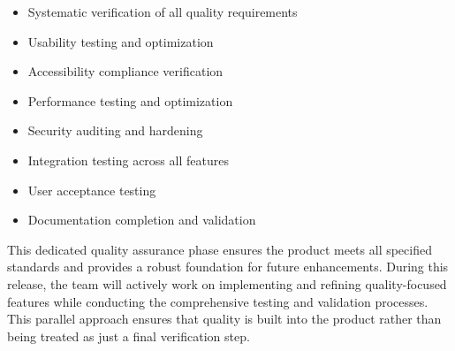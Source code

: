 \begin{itemize}
\item Systematic verification of all quality requirements
\item Usability testing and optimization
\item Accessibility compliance verification
\item Performance testing and optimization
\item Security auditing and hardening
\item Integration testing across all features
\item User acceptance testing
\item Documentation completion and validation
\end{itemize}

This dedicated quality assurance phase ensures the product meets all specified standards and provides a robust foundation for future enhancements. During this release, the team will actively work on implementing and refining quality-focused features while conducting the comprehensive testing and validation processes. This parallel approach ensures that quality is built into the product rather than being treated as just a final verification step.
